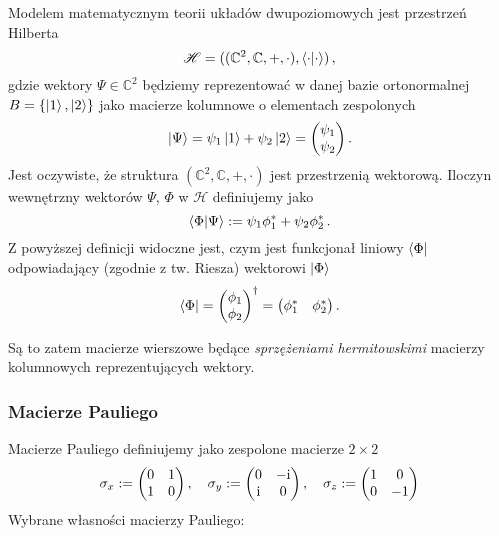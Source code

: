 \documentclass{myclass}
\begin{document}
Modelem matematycznym teorii układów dwupoziomowych jest przestrzeń Hilberta
\begin{equation*}
    \mathscr{H} = ((\mathbb{C}^2,\mathbb{C},+,\cdot), \braket{\cdot})\,,
\end{equation*}
gdzie wektory \(\Psi\in\mathbb{C}^2\) będziemy reprezentować w danej bazie ortonormalnej
\(B=\{\ket{1},\ket{2}\}\) jako macierze kolumnowe o elementach zespolonych
\begin{equation*}
    \ket{\Psi} = \psi_1\ket{1} + \psi_2\ket{2} = \mqty(\psi_1 \\ \psi_2)\,.
\end{equation*}
Jest oczywiste, że struktura \((\mathbb{C}^2,\mathbb{C},+,\cdot)\) jest przestrzenią wektorową.
Iloczyn wewnętrzny wektorów \(\Psi\), \(\Phi\) w \(\mathscr{H}\) definiujemy jako
\begin{equation*}
    \braket{\Phi}{\Psi} := \psi_1\phi_1^* + \psi_2\phi_2^*\,.
\end{equation*}
Z powyższej definicji widoczne jest, czym jest funkcjonał liniowy \(\bra{\Phi}\) odpowiadający
(zgodnie z tw. Riesza) wektorowi \(\ket{\Phi}\)
\begin{equation*}
    \bra{\Phi} = \mqty(\phi_1 \\ \phi_2)^\dagger = \mqty(\phi_1^* & \phi_2^*)\,.
\end{equation*}

Są to zatem macierze wierszowe będące \textit{sprzężeniami hermitowskimi} macierzy kolumnowych
reprezentujących wektory.

\subsubsection{Macierze Pauliego}

Macierze Pauliego definiujemy jako zespolone macierze \(2\times 2\)
\begin{equation*}
    \sigma_x := \mqty(0 & 1 \\ 1 & 0)\,,\quad \sigma_y := \mqty(0 & -\im \\ \im & 0)\,,\quad \sigma_z := \mqty(1 & 0 \\ 0 & -1)
\end{equation*}
Wybrane własności macierzy Pauliego:
\end{document}
